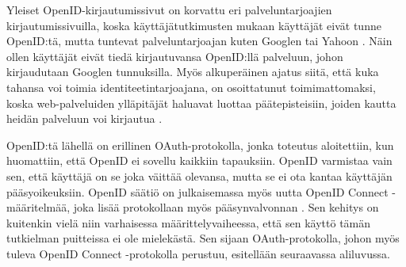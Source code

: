 Yleiset OpenID-kir\-jau\-tu\-mis\-si\-vut on korvattu eri palveluntarjoajien kirjautumissivuilla, koska käyttäjätutkimusten mukaan käyttäjät eivät tunne OpenID:tä, mutta tuntevat palveluntarjoajan kuten Googlen tai Yahoon \cite{refuse_sso}. Näin ollen käyttäjät eivät tiedä kirjautuvansa OpenID:llä palveluun, johon kirjaudutaan Googlen tunnuksilla. Myös alkuperäinen ajatus siitä, että kuka tahansa voi toimia identiteetintarjoajana, on osoittatunut toimimattomaksi, koska web-palveluiden ylläpitäjät haluavat luottaa päätepisteisiin, joiden kautta heidän palveluun voi kirjautua \cite{refuse_sso}.

OpenID:tä lähellä on erillinen OAuth-protokolla, jonka toteutus aloitettiin, kun huomattiin, että OpenID ei sovellu kaikkiin tapauksiin. OpenID varmistaa vain sen, että käyttäjä on se joka väittää olevansa, mutta se ei ota kantaa käyttäjän pääsyoikeuksiin. OpenID säätiö on julkaisemassa myös uutta OpenID Connect -määritelmää, joka lisää protokollaan myös pääsynvalvonnan \cite{distributed_web_security}. Sen kehitys on kuitenkin vielä niin varhaisessa määrittelyvaiheessa, että sen käyttö tämän tutkielman puitteissa ei ole mielekästä. Sen sijaan OAuth-protokolla, johon myös tuleva OpenID Connect -protokolla perustuu, esitellään seuraavassa aliluvussa.